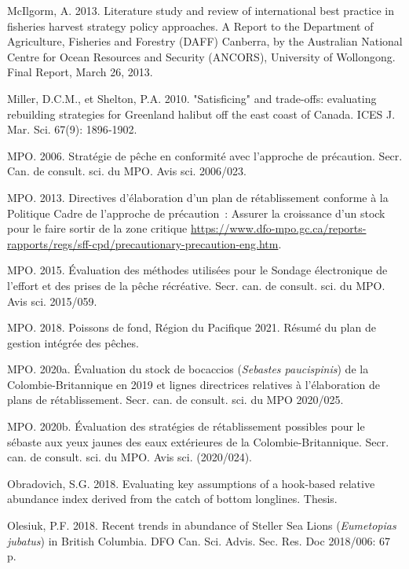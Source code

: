 \documentclass[french,11pt]{book}
\begin{document}
\leavevmode\hypertarget{ref-mcilgorm2013}{}%
McIlgorm, A. 2013. Literature study and review of international best practice in fisheries harvest strategy policy approaches. A Report to the Department of Agriculture, Fisheries and Forestry (DAFF) Canberra, by the Australian National Centre for Ocean Resources and Security (ANCORS), University of Wollongong. Final Report, March 26, 2013.

\leavevmode\hypertarget{ref-miller2010}{}%
Miller, D.C.M., et Shelton, P.A. 2010. "Satisficing" and trade-offs: evaluating rebuilding strategies for Greenland halibut off the east coast of Canada. ICES J. Mar. Sci. 67(9): 1896‑1902.

\leavevmode\hypertarget{ref-dfo2006}{}%
MPO. 2006. Stratégie de pêche en conformité avec l'approche de précaution. Secr. Can. de consult. sci. du MPO. Avis sci. 2006/023.

\leavevmode\hypertarget{ref-dfo2013}{}%
MPO. 2013. Directives d'élaboration d'un plan de rétablissement conforme à la Politique Cadre de l'approche de précaution~: Assurer la croissance d'un stock pour le faire sortir de la zone critique \url{https://www.dfo-mpo.gc.ca/reports-rapports/regs/sff-cpd/precautionary-precaution-eng.htm}.

\leavevmode\hypertarget{ref-dfo2015}{}%
MPO. 2015. Évaluation des méthodes utilisées pour le Sondage électronique de l'effort et des prises de la pêche récréative. Secr. can. de consult. sci. du MPO. Avis sci. 2015/059.

\leavevmode\hypertarget{ref-ifmp2018}{}%
MPO. 2018. Poissons de fond, Région du Pacifique 2021. Résumé du plan de gestion intégrée des pêches.

\leavevmode\hypertarget{ref-haigh2020}{}%
MPO. 2020a. Évaluation du stock de bocaccios (\emph{Sebastes paucispinis}) de la Colombie-Britannique en 2019 et lignes directrices relatives à l'élaboration de plans de rétablissement. Secr. can. de consult. sci. du MPO 2020/025.

\leavevmode\hypertarget{ref-dfo2020}{}%
MPO. 2020b. Évaluation des stratégies de rétablissement possibles pour le sébaste aux yeux jaunes des eaux extérieures de la Colombie-Britannique. Secr. can. de consult. sci. du MPO. Avis sci. (2020/024).

\leavevmode\hypertarget{ref-obradovich2018}{}%
Obradovich, S.G. 2018. Evaluating key assumptions of a hook-based relative abundance index derived from the catch of bottom longlines. Thesis.

\leavevmode\hypertarget{ref-olesiuk2018}{}%
Olesiuk, P.F. 2018. Recent trends in abundance of Steller Sea Lions (\emph{Eumetopias jubatus}) in British Columbia. DFO Can. Sci. Advis. Sec. Res. Doc 2018/006: 67 p.
\end{document}
